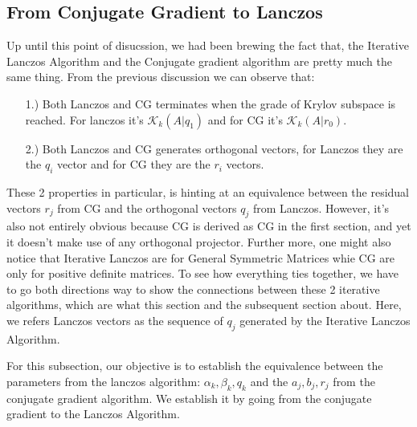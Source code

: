 \documentclass[]{article}
\theoremstyle{definition}
\begin{document}
    \subsection{From Conjugate Gradient to Lanczos}
        Up until this point of disucssion, we had been brewing the fact that, the Iterative Lanczos Algorithm and the Conjugate gradient algorithm are pretty much the same thing. From the previous discussion we can observe that: 
        \begin{enumerate}
            \item [1.)] Both Lanczos and CG terminates when the grade of Krylov subspace is reached. For lanczos it's $\mathcal K_k(A|q_1)$ and for CG it's $\mathcal K_k(A|r_0)$.
            \item [2.)] Both Lanczos and CG generates orthogonal vectors, for Lanczos they are the $q_i$ vector and for CG they are the $r_i$ vectors. 
        \end{enumerate}
        These 2 properties in particular, is hinting at an equivalence between the residual vectors $r_j$ from CG and the orthogonal vectors $q_j$ from Lanczos. However, it's also not entirely obvious because CG is derived as CG in the first section, and yet it doesn't make use of any orthogonal projector. Further more, one might also notice that Iterative Lanczos are for General Symmetric Matrices whie CG are only for positive definite matrices. To see how everything ties together, we have to go both directions way to show the connections between these 2 iterative algorithms, which are what this section and the subsequent section about. Here, we refers Lanczos vectors as the sequence of $q_j$ generated by the Iterative Lanczos Algorithm. 
        \par
        For this subsection, our objective is to establish the equivalence between the parameters from the lanczos algorithm: $\alpha_k, \beta_k, q_k$ and the $a_j, b_j, r_j$ from the conjugate gradient algorithm. We establish it by going from the conjugate gradient to the Lanczos Algorithm. 
\end{document}
